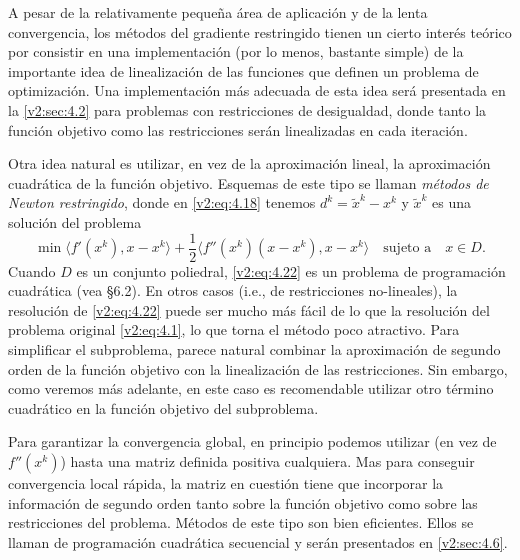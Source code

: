 
A pesar de la relativamente pequeña área de aplicación y de la lenta convergencia, los métodos del gradiente restringido tienen un cierto interés teórico por consistir en una implementación (por lo menos, bastante simple) de la importante idea de linealización de las funciones que definen un problema de optimización. Una implementación más adecuada de esta idea será presentada en la \cref{v2:sec:4.2} para problemas con restricciones de desigualdad, donde tanto la función objetivo como las restricciones serán linealizadas en cada iteración.

Otra idea natural es utilizar, en vez de la aproximación lineal, la aproximación cuadrática de la función objetivo. Esquemas de este tipo se llaman \textit{métodos de Newton restringido}, donde en \eqref{v2:eq:4.18} tenemos $d^k = \tilde{x}^k - x^k$ y $\tilde{x}^k$ es una solución del problema
\begin{equation}
    \min \langle f'(x^k), x - x^k \rangle + \frac{1}{2} \langle f''(x^k)(x - x^k), x - x^k \rangle \quad \text{sujeto a} \quad x \in D.
    \label{v2:eq:4.22}
\end{equation}
Cuando $D$ es un conjunto poliedral, \eqref{v2:eq:4.22} es un problema de programación cuadrática (vea \S 6.2). En otros casos (i.e., de restricciones no-lineales), la resolución de \eqref{v2:eq:4.22} puede ser mucho más fácil de lo que la resolución del problema original \eqref{v2:eq:4.1}, lo que torna el método poco atractivo. Para simplificar el subproblema, parece natural combinar la aproximación de segundo orden de la función objetivo con la linealización de las restricciones. Sin embargo, como veremos más adelante, en este caso es recomendable utilizar otro término cuadrático en la función objetivo del subproblema.

Para garantizar la convergencia global, en principio podemos utilizar (en vez de $f''(x^k)$) hasta una matriz definida positiva cualquiera. Mas para conseguir convergencia local rápida, la matriz en cuestión tiene que incorporar la información de segundo orden tanto sobre la función objetivo como sobre las restricciones del problema. Métodos de este tipo son bien eficientes. Ellos se llaman de programación cuadrática secuencial y serán presentados en \cref{v2:sec:4.6}.

